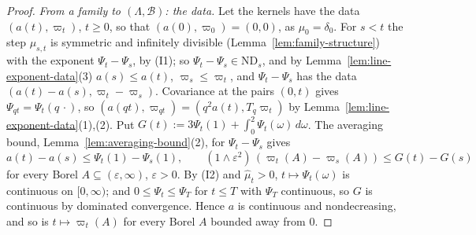 \begin{proof}
\leanok
{}
\emph{From a family to $(\Lambda, \mathcal{B})$: the data.} Let the kernels have the data
$(a(t), \varpi_t)$, $t \ge 0$, so that $(a(0), \varpi_0) = (0, 0)$, as $\mu_0 = \delta_0$. For
$s < t$ the step $\mu_{s,t}$ is symmetric and infinitely divisible
(Lemma~\ref{lem:family-structure}) with the exponent $\Psi_t - \Psi_s$, by (I1); so
$\Psi_t - \Psi_s \in \mathrm{ND}_s$, and by Lemma~\ref{lem:line-exponent-data}(3)
$a(s) \le a(t)$, $\varpi_s \le \varpi_t$, and $\Psi_t - \Psi_s$ has the data
$(a(t) - a(s), \varpi_t - \varpi_s)$. Covariance at the pairs $(0, t)$ gives
$\Psi_{qt} = \Psi_t(q\,\cdot)$, so $(a(qt), \varpi_{qt}) = (q^2a(t), T_q\varpi_t)$ by
Lemma~\ref{lem:line-exponent-data}(1),(2). Put
$G(t) := 3\Psi_t(1) + \int_0^2\Psi_t(\omega)\,d\omega$. The averaging bound,
Lemma~\ref{lem:averaging-bound}(2), for $\Psi_t - \Psi_s$ gives
\[
  a(t) - a(s) \le \Psi_t(1) - \Psi_s(1), \qquad
  (1 \wedge \varepsilon^2)\,(\varpi_t(A) - \varpi_s(A)) \le G(t) - G(s)
\]
for every Borel $A \subseteq (\varepsilon, \infty)$, $\varepsilon > 0$. By (I2) and
$\widehat\mu_t > 0$, $t \mapsto \Psi_t(\omega)$ is continuous on $[0,\infty)$; and
$0 \le \Psi_t \le \Psi_T$ for $t \le T$ with $\Psi_T$ continuous, so $G$ is continuous by
dominated convergence. Hence $a$ is continuous and nondecreasing, and so is $t \mapsto \varpi_t(A)$
for every Borel $A$ bounded away from $0$.


\end{proof}

